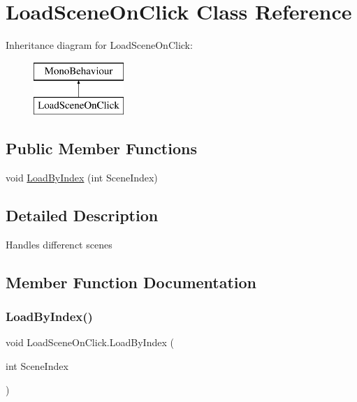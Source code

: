 \hypertarget{class_load_scene_on_click}{}\section{Load\+Scene\+On\+Click Class Reference}
\label{class_load_scene_on_click}
Inheritance diagram for Load\+Scene\+On\+Click\+:\begin{figure}[H]
\begin{center}
\leavevmode
\includegraphics[height=2.000000cm]{class_load_scene_on_click}
\end{center}
\end{figure}
\subsection*{Public Member Functions}
\begin{DoxyCompactItemize}
\item 
void \hyperlink{class_load_scene_on_click_a2e42d46710af3967cbfcdf5b87fb61f2}{Load\+By\+Index} (int Scene\+Index)
\end{DoxyCompactItemize}


\subsection{Detailed Description}
Handles differenct scenes 

\subsection{Member Function Documentation}
\mbox{\label{class_load_scene_on_click_a2e42d46710af3967cbfcdf5b87fb61f2}} 
\subsubsection{\texorpdfstring{Load\+By\+Index()}{LoadByIndex()}}
{\footnotesize\ttfamily void Load\+Scene\+On\+Click.\+Load\+By\+Index (\begin{DoxyParamCaption}\item[{int}]{Scene\+Index }\end{DoxyParamCaption})}

